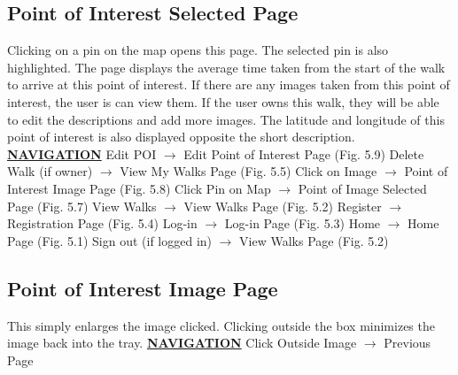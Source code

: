\documentclass[12pt]{article}
\begin{document}
\subsection{Point of Interest Selected Page}
\par{Clicking on a pin on the map opens this page. The selected pin is also highlighted. The page
displays the average time taken from the start of the walk to arrive at this point of interest.
If there are any images taken from this point of interest, the user is can view them. If the
user owns this walk, they will be able to edit the descriptions and add more images. The
latitude and longitude of this point of interest is also displayed opposite the short
description.} \newline 
\textbf{\underline{NAVIGATION}} \newline
Edit POI $\rightarrow$ Edit Point of Interest Page (Fig. 5.9) \newline
Delete Walk (if owner) $\rightarrow$ View My Walks Page (Fig. 5.5) \newline
Click on Image $\rightarrow$ Point of Interest Image Page (Fig. 5.8)\newline
Click Pin on Map $\rightarrow$ Point of Image Selected Page (Fig. 5.7) \newline
View Walks $\rightarrow$ View Walks Page (Fig. 5.2) \newline
Register $\rightarrow$ Registration Page (Fig. 5.4) \newline
Log-in $\rightarrow$ Log-in Page (Fig. 5.3) \newline
Home $\rightarrow$ Home Page (Fig. 5.1) \newline
Sign out (if logged in) $\rightarrow$ View Walks Page (Fig. 5.2) \newline
\subsection{ Point of Interest Image Page}
\par{This simply enlarges the image clicked. Clicking outside the box minimizes the image back
into the tray.}\newline 
\textbf{\underline{NAVIGATION}} \newline
Click Outside Image $\rightarrow$ Previous Page \newline
\end{document}
